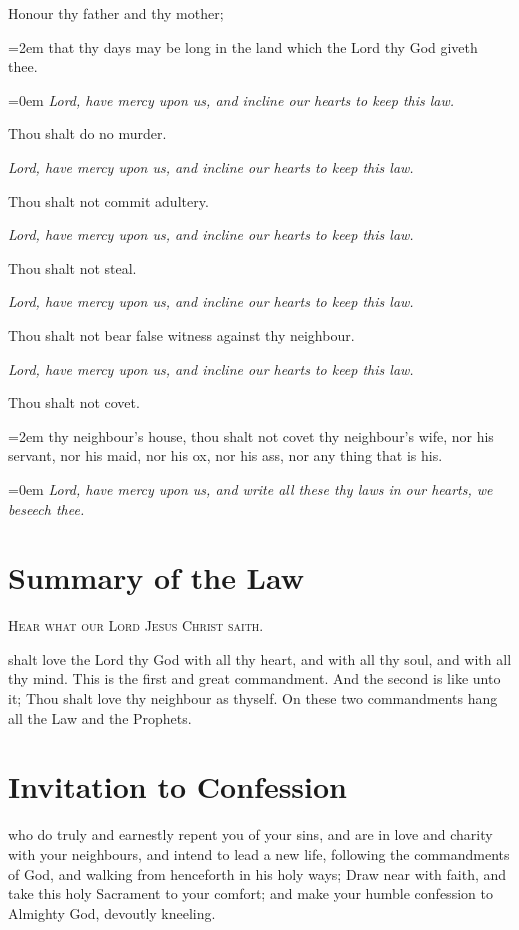     \par\noindent
    Honour thy father and thy mother;
    \par\noindent
    \leftskip=2em
	{\small{that thy days may be long in the land which the Lord thy God giveth thee.}}
	\par
	\leftskip=0em
    \textit{Lord, have mercy upon us, and incline our hearts to keep this law.}
    \par\noindent
    Thou shalt do no murder.\par
    \textit{Lord, have mercy upon us, and incline our hearts to keep this law.}
    \par\noindent
    Thou shalt not commit adultery.\par
    \textit{Lord, have mercy upon us, and incline our hearts to keep this law.}
\par\noindent
    Thou shalt not steal.\par
    \textit{Lord, have mercy upon us, and incline our hearts to keep this law.}
\par\noindent
    Thou shalt not bear false witness against thy neighbour.\par
    \textit{Lord, have mercy upon us, and incline our hearts to keep this law.}
    \par\noindent
    Thou shalt not covet.
    \par\noindent
    \leftskip=2em
	{\small{thy neighbour's house, thou shalt not covet thy neighbour's wife, nor his servant, nor his maid, nor his ox, nor his ass, nor any thing that is his.}}
	\par
	\leftskip=0em
	\textit{Lord, have mercy upon us, and write all these thy laws in our hearts, we beseech thee.}
\clearpage
\section*{Summary of the Law}
\begin{center}
	{\textsc{Hear what our Lord Jesus Christ saith.}}
\end{center}

 shalt love the Lord thy God with all thy heart, and with all thy soul, and with all thy mind. This is the first and great commandment. And the second is like unto it; Thou shalt love thy neighbour as thyself. On these two commandments hang all the Law and the Prophets.

\section*{Invitation to Confession}
 who do truly and earnestly repent you of your sins, and are in love and charity with your neighbours, and intend to lead a new life, following the commandments of God, and walking from henceforth in his holy ways; Draw near with faith, and take this holy Sacrament to your comfort; and make your humble confession to Almighty God, devoutly kneeling.

